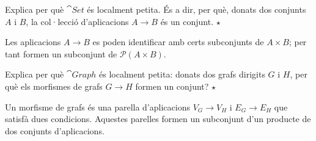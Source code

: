 \begin{exercici}
Explica per què $\cat{Set}$ és localment petita. És a dir, per què, donats dos conjunts $A$ i $B$, la col·lecció d'aplicacions $A\to B$ és un conjunt. \hfill{\normalfont$\star$}
\begin{indicacio}
Les aplicacions $A\to B$ es poden identificar amb certs subconjunts de $A\times B$; per tant formen un subconjunt de $\mathcal P(A\times B)$.
\end{indicacio}
\end{exercici}

\begin{exercici}
Explica per què $\cat{Graph}$ és localment petita: donats dos grafs dirigits $G$ i $H$, per què els morfismes de grafs $G\to H$ formen un conjunt? \hfill{\normalfont$\star$}
\begin{indicacio}
Un morfisme de grafs és una parella d'aplicacions $V_G\to V_H$ i $E_G\to E_H$ que satisfà dues condicions. Aquestes parelles formen un subconjunt d'un producte de dos conjunts d'aplicacions.
\end{indicacio}
\end{exercici}